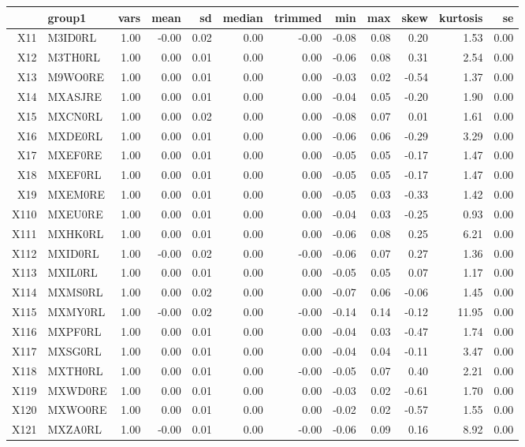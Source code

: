 \documentclass[11pt,preprint, authoryear]{elsarticle}
\let\origtable\table
\let\endorigtable\endtable
\renewenvironment{table}[1][2] {
    \expandafter\origtable\expandafter[H]
} {
    \endorigtable
}
\numberwithin{equation}{section}
\numberwithin{figure}{section}
\numberwithin{table}{section}
\begin{document}
\begin{table}[H]
\centering
\begin{tabular}{rlrrrrrrrrrr}
  \hline
 & group1 & vars & mean & sd & median & trimmed & min & max & skew & kurtosis & se \\ 
  \hline
X11 & M3ID0RL & 1.00 & -0.00 & 0.02 & 0.00 & -0.00 & -0.08 & 0.08 & 0.20 & 1.53 & 0.00 \\ 
  X12 & M3TH0RL & 1.00 & 0.00 & 0.01 & 0.00 & 0.00 & -0.06 & 0.08 & 0.31 & 2.54 & 0.00 \\ 
  X13 & M9WO0RE & 1.00 & 0.00 & 0.01 & 0.00 & 0.00 & -0.03 & 0.02 & -0.54 & 1.37 & 0.00 \\ 
  X14 & MXASJRE & 1.00 & 0.00 & 0.01 & 0.00 & 0.00 & -0.04 & 0.05 & -0.20 & 1.90 & 0.00 \\ 
  X15 & MXCN0RL & 1.00 & 0.00 & 0.02 & 0.00 & 0.00 & -0.08 & 0.07 & 0.01 & 1.61 & 0.00 \\ 
  X16 & MXDE0RL & 1.00 & 0.00 & 0.01 & 0.00 & 0.00 & -0.06 & 0.06 & -0.29 & 3.29 & 0.00 \\ 
  X17 & MXEF0RE & 1.00 & 0.00 & 0.01 & 0.00 & 0.00 & -0.05 & 0.05 & -0.17 & 1.47 & 0.00 \\ 
  X18 & MXEF0RL & 1.00 & 0.00 & 0.01 & 0.00 & 0.00 & -0.05 & 0.05 & -0.17 & 1.47 & 0.00 \\ 
  X19 & MXEM0RE & 1.00 & 0.00 & 0.01 & 0.00 & 0.00 & -0.05 & 0.03 & -0.33 & 1.42 & 0.00 \\ 
  X110 & MXEU0RE & 1.00 & 0.00 & 0.01 & 0.00 & 0.00 & -0.04 & 0.03 & -0.25 & 0.93 & 0.00 \\ 
  X111 & MXHK0RL & 1.00 & 0.00 & 0.01 & 0.00 & 0.00 & -0.06 & 0.08 & 0.25 & 6.21 & 0.00 \\ 
  X112 & MXID0RL & 1.00 & -0.00 & 0.02 & 0.00 & -0.00 & -0.06 & 0.07 & 0.27 & 1.36 & 0.00 \\ 
  X113 & MXIL0RL & 1.00 & 0.00 & 0.01 & 0.00 & 0.00 & -0.05 & 0.05 & 0.07 & 1.17 & 0.00 \\ 
  X114 & MXMS0RL & 1.00 & 0.00 & 0.02 & 0.00 & 0.00 & -0.07 & 0.06 & -0.06 & 1.45 & 0.00 \\ 
  X115 & MXMY0RL & 1.00 & -0.00 & 0.02 & 0.00 & -0.00 & -0.14 & 0.14 & -0.12 & 11.95 & 0.00 \\ 
  X116 & MXPF0RL & 1.00 & 0.00 & 0.01 & 0.00 & 0.00 & -0.04 & 0.03 & -0.47 & 1.74 & 0.00 \\ 
  X117 & MXSG0RL & 1.00 & 0.00 & 0.01 & 0.00 & 0.00 & -0.04 & 0.04 & -0.11 & 3.47 & 0.00 \\ 
  X118 & MXTH0RL & 1.00 & 0.00 & 0.01 & 0.00 & -0.00 & -0.05 & 0.07 & 0.40 & 2.21 & 0.00 \\ 
  X119 & MXWD0RE & 1.00 & 0.00 & 0.01 & 0.00 & 0.00 & -0.03 & 0.02 & -0.61 & 1.70 & 0.00 \\ 
  X120 & MXWO0RE & 1.00 & 0.00 & 0.01 & 0.00 & 0.00 & -0.02 & 0.02 & -0.57 & 1.55 & 0.00 \\ 
  X121 & MXZA0RL & 1.00 & -0.00 & 0.01 & 0.00 & -0.00 & -0.06 & 0.09 & 0.16 & 8.92 & 0.00 \\ 
   \hline
\end{tabular}
\caption{Descriptive Statistics Table \label{tab2}} 
\end{table}
\end{document}
